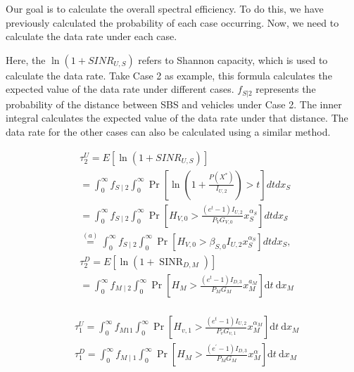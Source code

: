 \documentclass[conference]{IEEEtran}
\begin{document}
\begin{CJK*}{UTF8}{bsmi}
Our goal is to calculate the overall spectral efficiency. To do this, we have previously calculated the probability of each case occurring. Now, we need to calculate the data rate under each case.
\par Here, the $\ln \left(1+S I N R_{U, S}\right)$ refers to Shannon capacity, which is used to calculate the data rate. Take Case 2 as example, this formula calculates the expected value of the data rate under different cases. $f_{S|2}$ represents the probability of the distance between SBS and vehicles under Case 2. The inner integral calculates the expected value of the data rate under that distance. The data rate for the other cases can also be calculated using a similar method.



\begin{equation}
\begin{aligned}
& \tau_2^U=E\left[\ln \left(1+S I N R_{U, S}\right)\right] \\
& =\int_0^{\infty} f_{S \mid 2} \int_0^{\infty} \operatorname{Pr}\left[\ln \left(1+\frac{P\left(X^*\right)}{I_{U, 2}}\right)>t\right] d t d x_S \\
& =\int_0^{\infty} f_{S \mid 2} \int_0^{\infty} \operatorname{Pr}\left[H_{V, 0}>\frac{\left(e^t-1\right) I_{U, 2}}{P_V G_{V, 0}} x_S^{\alpha_S}\right] d t d x_{\mathcal{S}} \\
& \stackrel{(a)}{=} \int_0^{\infty} f_{S \mid 2} \int_0^{\infty} \operatorname{Pr}\left[H_{V, 0}>\beta_{S, 0} I_{U, 2} x_S^{\alpha_S}\right] d t d x_S \text {, } \\
& \tau_2^D=E\left[\ln \left(1+\operatorname{SINR}_{D, M}\right)\right] \\
& =\int_0^{\infty} f_{M \mid 2} \int_0^{\infty} \operatorname{Pr}\left[H_M>\frac{\left(e^t-1\right) I_{D, 3}}{P_M G_M} x_M^{a_M}\right] \mathrm{d} t \mathrm{~d} x_M \\
\end{aligned}
\end{equation}

\begin{equation}
\begin{aligned}
& \tau_1^U=\int_0^{\infty} f_{M 11} \int_0^{\infty} \operatorname{Pr}\left[H_{v, 1}>\frac{\left(e^t-1\right) I_{U, 2}}{P_v G_{v, 1}} x_M^{\alpha_M}\right] \mathrm{d} t \mathrm{~d} x_M \\
& \tau_1^D=\int_0^{\infty} f_{M \mid 1} \int_0^{\infty} \operatorname{Pr}\left[H_M>\frac{\left(e^{\prime}-1\right) I_{D, 3}}{P_M G_M} x_M^\alpha\right] \mathrm{d} t \mathrm{~d} x_M \\
\end{aligned}
\end{equation}


\end{CJK*}
\end{document}
